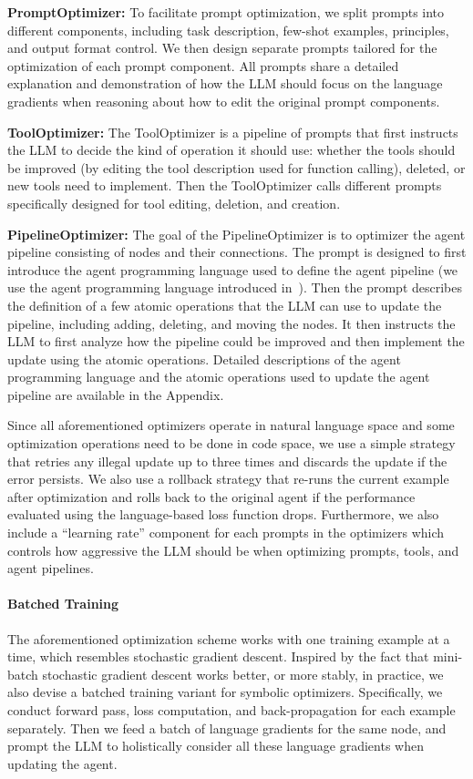 \noindent\textbf{PromptOptimizer:} To facilitate prompt optimization, we split prompts into different components, including task description, few-shot examples, principles, and output format control. We then design separate prompts tailored for the optimization of each prompt component. All prompts share a detailed explanation and demonstration of how the LLM should focus on the language gradients when reasoning about how to edit the original prompt components.

\noindent\textbf{ToolOptimizer:} The ToolOptimizer is a pipeline of prompts that first instructs the LLM to decide the kind of operation it should use: whether the tools should be improved (by editing the tool description used for function calling), deleted, or new tools need to implement. Then the ToolOptimizer calls different prompts specifically designed for tool editing, deletion, and creation. 

\noindent\textbf{PipelineOptimizer:}
The goal of the PipelineOptimizer is to optimizer the agent pipeline consisting of nodes and their connections. The prompt is designed to first introduce the agent programming language used to define the agent pipeline (we use the agent programming language introduced in~\citet{zhou2023agents}). Then the prompt describes the definition of a few atomic operations that the LLM can use to update the pipeline, including adding, deleting, and moving the nodes. It then instructs the LLM to first analyze how the pipeline could be improved and then implement the update using the atomic operations. Detailed descriptions of the agent programming language and the atomic operations used to update the agent pipeline are available in the Appendix.

Since all aforementioned optimizers operate in natural language space and some optimization operations need to be done in code space, we use a simple strategy that retries any illegal update up to three times and discards the update if the error persists. We also use a rollback strategy that re-runs the current example after optimization and rolls back to the original agent if the performance evaluated using the language-based loss function drops. Furthermore, we also include a ``learning rate'' component for each prompts in the optimizers which controls how aggressive the LLM should be when optimizing prompts, tools, and agent pipelines.

\paragraph{Batched Training}
The aforementioned optimization scheme works with one training example at a time, which resembles stochastic gradient descent. Inspired by the fact that mini-batch stochastic gradient descent works better, or more stably, in practice, we also devise a batched training variant for symbolic optimizers. Specifically, we conduct forward pass, loss computation, and back-propagation for each example separately. Then we feed a batch of language gradients for the same node, and prompt the LLM to holistically consider all these language gradients when updating the agent.   
